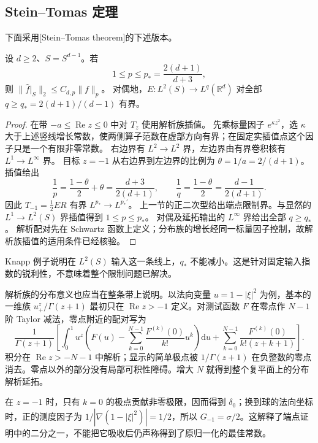 \subsection{Stein–Tomas 定理}
\label{b2:subsec:230403}

下面采用[Stein--Tomas theorem]的下述版本。

\begin{theorem}\label{b2:thm:23-stein-tomas}
设 \(d\ge2\)、\(S=S^{d-1}\)。若
\[
 1\le p\le p_*=\frac{2(d+1)}{d+3},
\]
则 \(\|\widehat f|_S\|_2\le C_{d,p}\|f\|_p\)。
对偶地，\(E:L^2(S)\to L^q(\mathbb R^d)\) 对全部
\(q\ge q_*=2(d+1)/(d-1)\) 有界。
\end{theorem}
\begin{proof}
在带 \(-a\le\operatorname{Re}z\le0\) 中对 \(T_z\) 使用解析族插值。
先乘标量因子 \(e^{\kappa z^2}\)，选 \(\kappa\) 大于上述竖线增长常数，使两侧算子范数在虚部方向有界；在固定实插值点这个因子只是一个有限非零常数。
右边界有 \(L^2\to L^2\) 界，左边界由有界卷积核有 \(L^1\to L^\infty\) 界。
目标 \(z=-1\) 从右边界到左边界的比例为
\(\theta=1/a=2/(d+1)\)。插值给出
\[
 \frac1p=\frac{1-\theta}{2}+\theta
       =\frac{d+3}{2(d+1)},\qquad
 \frac1q=\frac{1-\theta}{2}=\frac{d-1}{2(d+1)}.
\]
因此 \(T_{-1}=\tfrac12 ER\) 有界 \(L^{p_*}\to L^{p_*'}\)。
上一节的正二次型给出端点限制界。与显然的
\(L^1\to L^2(S)\) 界插值得到 \(1\le p\le p_*\)。
对偶及延拓输出的 \(L^\infty\) 界给出全部 \(q\ge q_*\)。
解析配对先在 Schwartz 函数上定义；分布族的增长经同一标量因子控制，故解析族插值的适用条件已经核验。
\end{proof}
Knapp 例子说明在 \(L^2(S)\) 输入这一条线上，\(q_*\) 不能减小。这是针对固定输入指数的锐利性，不意味着整个限制问题已解决。

解析族的分布意义也应当在整条带上说明。以法向变量 \(u=1-|\xi|^2\) 为例，基本的一维族
\(u_+^z/\Gamma(z+1)\) 最初只在 \(\operatorname{Re}z>-1\) 定义。对测试函数 \(F\) 在零点作 \(N-1\) 阶 Taylor 减法，零点附近的配对写为
\[
 \frac1{\Gamma(z+1)}
 \left[\int_0^1u^z
 \left(F(u)-\sum_{k=0}^{N-1}\frac{F^{(k)}(0)}{k!}u^k\right)\mathrm du
 +\sum_{k=0}^{N-1}\frac{F^{(k)}(0)}{k!(z+k+1)}\right].
\]
积分在 \(\operatorname{Re}z>-N-1\) 中解析；显示的简单极点被 \(1/\Gamma(z+1)\) 在负整数的零点消去。零点以外的部分没有局部可积性障碍。增大 \(N\) 就得到整个复平面上的分布解析延拓。

\ProseParagraphBreak

在 \(z=-1\) 时，只有 \(k=0\) 的极点贡献非零极限，因而得到 \(\delta_0\)；换到球的法向坐标时，正的测度因子为 \(1/|\nabla(1-|\xi|^2)|=1/2\)，所以 \(G_{-1}=\sigma/2\)。这解释了端点证明中的二分之一，不能把它吸收后仍声称得到了原归一化的最佳常数。

